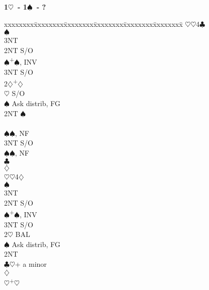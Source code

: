 \documentclass[10pt]{article}
\renewcommand{\c}{$\clubsuit$}
\renewcommand{\d}{$\diamondsuit$}
\newcommand{\h}{$\heartsuit$}
\newcommand{\s}{$\spadesuit$}
\newcommand{\p}{\textsuperscript{+}}
\newenvironment{bidtable}[1][]
{\textbf{#1}
  \begin{adjustwidth}{1em}{}
    \addvspace{2pt}
    \begin{tabbing}
      xxxxxxxx\=xxxxxxxx\=xxxxxxxx\=xxxxxxxx\=xxxxxxxx\=xxxxxxxx\=\kill}
{\end{tabbing}\end{adjustwidth}\bigskip}%
\begin{document}
\begin{multicols*}{2}
\begin{bidtable}[1\h\ - 1\s\ - ?]
    \>      \h {}\h 4\c                       \\
    \>      \s {}                          \\
    \>      \> 3NT                           \\
    \> 2NT  \> S/O                                  \\
    \s  {}\p\s, INV                           \\
    \> 3NT  \> S/O                                  \\
2\d {}\p\d                                        \\
    \h  \> S/O                                  \\
    \s  \> Ask distrib, FG                      \\
    \>      \> 2NT \s                           \\
    \>      \>     \>     \>                        \\
    \>      \>     \s {}\s, NF                \\
    \>      \>     \> 3NT \> S/O                    \\
    \>      \>     \s {}\s, NF                \\
    \>      \c {}                          \\
    \>      \d {}                          \\
    \>      \h {}\h 4\d                       \\
    \>      \s {}                          \\
    \>      \> 3NT                           \\
    \> 2NT  \> S/O                                  \\
    \s  {}\p\s, INV                           \\
    \> 3NT  \> S/O                                  \\
2\h \> BAL                                          \\
    \s  \> Ask distrib, FG                      \\
    \>      \> 2NT                           \\
    \>      \c {}\h + a minor                 \\
    \>      \d {}                          \\
    \>      \h {}\p\h                         \\

\end{bidtable}
\end{multicols*}
\end{document}
